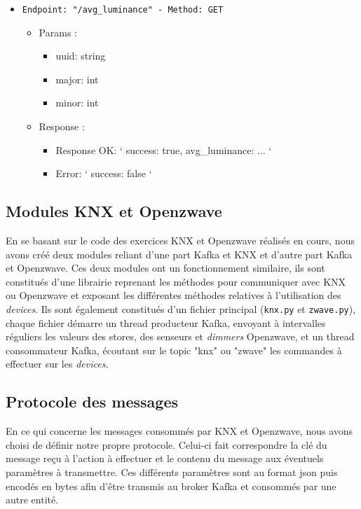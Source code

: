 \begin{itemize}
  \item \texttt{Endpoint: "/avg_luminance" -  Method: GET}
  \begin{itemize} 
    \item Params :
    \begin{itemize}
      \item uuid: string
      \item major: int
      \item minor: int
    \end{itemize}

    \item Response : 
    \begin{itemize}
      \item Response OK: `{ success: true, avg_luminance: ... }`
      \item Error: `{ success: false }`
    \end{itemize}
  \end{itemize}
\end{itemize}




\subsection{Modules KNX et Openzwave}
En se basant sur le code des exercices KNX et Openzwave réalisés en cours, nous avons créé deux modules reliant d'une part Kafka et KNX et d'autre part Kafka et Openzwave. Ces deux modules ont un fonctionnement similaire, ils sont constitués d'une librairie reprenant les méthodes pour communiquer avec KNX ou Openzwave et exposant les différentes méthodes relatives à l'utilisation des \textit{\textit{devices}}. Ils sont également constitués d'un fichier principal (\texttt{knx.py} et \texttt{zwave.py}), chaque fichier démarre un thread producteur Kafka, envoyant à intervalles réguliers les valeurs des stores, des senseurs et \textit{dimmers} Openzwave, et un thread consommateur Kafka, écoutant sur le topic "knx" ou "zwave" les commandes à effectuer sur les \textit{\textit{devices}}.

\subsection{Protocole des messages}
En ce qui concerne les messages consommés par KNX et Openzwave, nous avons choisi de définir notre propre protocole.
Celui-ci fait correspondre la clé du message reçu à l'action à effectuer et le contenu du message aux éventuels paramètres à transmettre. Ces différents paramètres sont au format \acrshort{json} puis encodés en bytes afin d'être transmis au broker Kafka et consommés par une autre entité.

